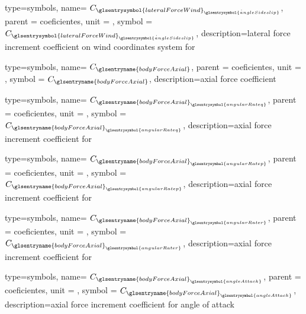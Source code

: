 {type=symbols,
    name= \ensuremath{C_{{\glsentrysymbol{lateralForceWind}}_{\dot{\glsentrysymbol{angleSideslip}}}}},
    parent = {coeficientes},
    unit = \unexpanded{},
    symbol = \ensuremath{C_{{\glsentrysymbol{lateralForceWind}}_{\dot{\glsentrysymbol{angleSideslip}}}}},
    description={lateral force increment coefficient on wind coordinates system  for }
}


{type=symbols,
    name= \ensuremath{C_{\glsentryname{bodyForceAxial}}},
    parent = {coeficientes},
    unit = \unexpanded{},
    symbol = \ensuremath{C_{\glsentryname{bodyForceAxial}}},
    description={axial force coefficient}
}

{type=symbols,
    name= \ensuremath{C_{{\glsentryname{bodyForceAxial}}_{\glsentrysymbol{angularRateq}}}},
    parent = {coeficientes},
    unit = \unexpanded{},
    symbol = \ensuremath{C_{{\glsentryname{bodyForceAxial}}_{\glsentrysymbol{angularRateq}}}},
    description={axial force increment coefficient for }
}

{type=symbols,
    name= \ensuremath{C_{{\glsentryname{bodyForceAxial}}_{\glsentrysymbol{angularRatep}}}},
    parent = {coeficientes},
    unit = \unexpanded{},
    symbol = \ensuremath{C_{{\glsentryname{bodyForceAxial}}_{\glsentrysymbol{angularRatep}}}},
    description={axial force increment coefficient for }
}

{type=symbols,
    name= \ensuremath{C_{{\glsentryname{bodyForceAxial}}_{\glsentrysymbol{angularRater}}}},
    parent = {coeficientes},
    unit = \unexpanded{},
    symbol = \ensuremath{C_{{\glsentryname{bodyForceAxial}}_{\glsentrysymbol{angularRater}}}},
    description={axial force increment coefficient for }
}

{type=symbols,
    name= \ensuremath{C_{{\glsentryname{bodyForceAxial}}_{\glsentrysymbol{angleAttack}}}},
    parent = {coeficientes},
    unit = \unexpanded{},
    symbol = \ensuremath{C_{{\glsentryname{bodyForceAxial}}_{\glsentrysymbol{angleAttack}}}},
    description={axial force increment coefficient for angle of attack}
}



